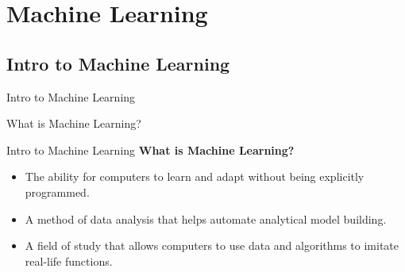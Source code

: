 \documentclass{beamer}
\begin{document}
\section{Machine Learning}
\subsection{Intro to Machine Learning}
\begin{frame}[fragile]{Intro to Machine Learning}
    \begin{center}
        \Huge What is Machine Learning?
    \end{center}
\end{frame}
\begin{frame}[fragile]{Intro to Machine Learning}
    \textbf{What is Machine Learning?}
    \begin{itemize}
        \item The ability for computers to learn and adapt without being explicitly programmed.
        \pause
        \item A method of data analysis that helps automate analytical model building.
        \pause
        \item A field of study that allows computers to use data and algorithms to imitate real-life functions.
    \end{itemize}
\end{frame}
\end{document}
